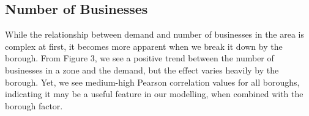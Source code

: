 \documentclass[11pt]{article}
\begin{document}
\subsection{Number of Businesses}
While the relationship between demand and number of businesses in the area is complex at first, it becomes more apparent when we break it down by the borough. From Figure 3, we see a positive trend between the number of businesses in a zone and the demand, but the effect varies heavily by the borough. Yet, we see medium-high Pearson correlation values for all boroughs, indicating it may be a useful feature in our modelling, when combined with the borough factor.

\begin{figure}[H]
\begin{floatrow}

\end{floatrow}
\end{figure}

\end{document}
